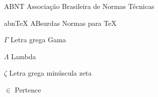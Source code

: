\documentclass[article,12pt,oneside,a4paper,chapter=TITLE,english,brazil]{abntex2}
\begin{document}
\newpage
{}
\listoffigures*
\cleardoublepage


\listoftables*
\cleardoublepage






\begin{siglas}
  \item[ABNT] Associação Brasileira de Normas Técnicas
  \item[abnTeX] ABsurdas Normas para TeX
\end{siglas}


\begin{simbolos}
  \item[$\Gamma$] Letra grega Gama
  \item[$\Lambda$] Lambda
  \item[$\zeta$] Letra grega minúscula zeta
  \item[$ \in $] Pertence
\end{simbolos}
\end{document}
